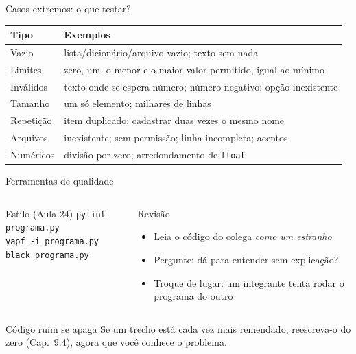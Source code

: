 \documentclass[aspectratio=169,10pt,t]{beamer}
\begin{document}
\begin{frame}{Casos extremos: o que testar?}
  \centering\small
  \begin{tabular}{p{3.4cm}p{8.4cm}}
    \toprule
    \textbf{Tipo} & \textbf{Exemplos}\\
    \midrule
    Vazio & lista/dicionário/arquivo vazio; texto sem nada\\
    Limites & zero, um, o menor e o maior valor permitido, igual ao mínimo\\
    Inválidos & texto onde se espera número; número negativo; opção inexistente\\
    Tamanho & um só elemento; milhares de linhas\\
    Repetição & item duplicado; cadastrar duas vezes o mesmo nome\\
    Arquivos & inexistente; sem permissão; linha incompleta; acentos\\
    Numéricos & divisão por zero; arredondamento de \texttt{float}\\
    \bottomrule
  \end{tabular}
\end{frame}

\begin{frame}{Ferramentas de qualidade}
  \begin{columns}[T]
    \begin{block}{Estilo (Aula 24)}
      \texttt{pylint programa.py}\\
      \texttt{yapf -i programa.py}\\
      \texttt{black programa.py}
    \end{block}
    \begin{block}{Revisão}
      \begin{itemize}\small
        \item Leia o código do colega \emph{como um estranho}
        \item Pergunte: dá para entender sem explicação?
        \item Troque de lugar: um integrante tenta rodar o programa do outro
      \end{itemize}
    \end{block}
  \end{columns}
  \vspace{1ex}
  \begin{alertblock}{Código ruim se apaga}
    Se um trecho está cada vez mais remendado, reescreva-o do zero (Cap.~9.4), agora que você conhece o problema.
  \end{alertblock}
\end{frame}
\end{document}
